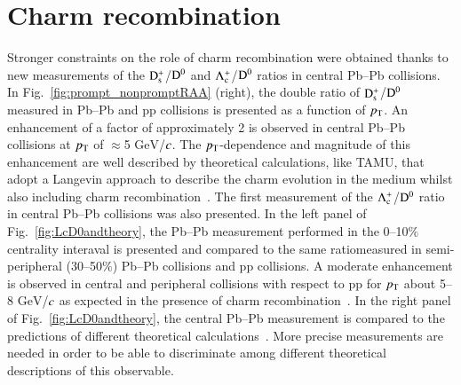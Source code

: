 \documentclass[3p,times,procedia]{elsarticle}
\newcommand{\GeV}{\mathrm{GeV}}
\newcommand{\pt}{p_{\rm T}}
\newcommand{\Dzero}{{\rm D^0}}
\newcommand{\Ds}{{\rm D_{s}^+}}
\newcommand{\Lc}{{\rm \Lambda_{c}^+}}
\begin{document}
\section{Charm recombination}
\label{recombination}
Stronger constraints on the role of charm recombination were obtained thanks to new measurements of the $\Ds$/$\Dzero$ and $\Lc$/$\Dzero$ ratios
in central Pb--Pb collisions. In Fig.~\ref{fig:prompt_nonpromptRAA} (right), the double ratio of $\Ds$/$\Dzero$ measured in Pb--Pb and pp collisions 
is presented as a function of $\pt$. An enhancement of a factor of approximately 2 is observed in central Pb--Pb collisions at $\pt$ of $\approx$5 
$\GeV$/$\it{c}$. The $\pt$-dependence and magnitude 
of this enhancement are well described by theoretical calculations, like TAMU, that adopt a Langevin approach to describe the charm evolution in the 
medium whilst also including charm recombination~\cite{tamu}. The first measurement of the $\Lc$/$\Dzero$ ratio in central Pb--Pb collisions was also presented. 
In the left panel of Fig.~\ref{fig:LcD0andtheory}, the Pb--Pb measurement performed in the 0--10$\%$ centrality interaval
is presented and compared to the same ratiomeasured in semi-peripheral (30--50$\%$) Pb--Pb collisions and pp collisions. 
A moderate enhancement is observed in central and
peripheral collisions with respect to pp for $\pt$ about 5--8 $\GeV$/$\it{c}$ as expected in the presence of charm recombination~\cite{tamu}. 
In the right panel of Fig.~\ref{fig:LcD0andtheory}, the central Pb--Pb measurement is compared to the predictions of
different theoretical calculations~\cite{catania,shm,pythia8}.
More precise measurements are needed in order to be able to discriminate among different theoretical descriptions of this observable.
\end{document}
